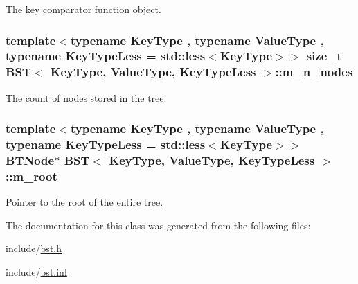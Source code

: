 The key comparator function object. 

\subsubsection[{\texorpdfstring{m\+\_\+n\+\_\+nodes}{m_n_nodes}}]{\setlength{\rightskip}{0pt plus 5cm}template$<$typename Key\+Type , typename Value\+Type , typename Key\+Type\+Less  = std\+::less$<$\+Key\+Type$>$$>$ size\+\_\+t {\bf B\+ST}$<$ Key\+Type, Value\+Type, Key\+Type\+Less $>$\+::m\+\_\+n\+\_\+nodes\hspace{0.3cm}{\ttfamily [private]}}\hypertarget{class_b_s_t_a38f358a38c855ebc8bd866f6ae96aa5a}{}\label{class_b_s_t_a38f358a38c855ebc8bd866f6ae96aa5a}


The count of nodes stored in the tree. 

\subsubsection[{\texorpdfstring{m\+\_\+root}{m_root}}]{\setlength{\rightskip}{0pt plus 5cm}template$<$typename Key\+Type , typename Value\+Type , typename Key\+Type\+Less  = std\+::less$<$\+Key\+Type$>$$>$ {\bf B\+T\+Node}$\ast$ {\bf B\+ST}$<$ Key\+Type, Value\+Type, Key\+Type\+Less $>$\+::m\+\_\+root\hspace{0.3cm}{\ttfamily [private]}}\hypertarget{class_b_s_t_af2a361060692deacc5be429288eece96}{}\label{class_b_s_t_af2a361060692deacc5be429288eece96}


Pointer to the root of the entire tree. 



The documentation for this class was generated from the following files\+:\begin{DoxyCompactItemize}
\item 
include/\hyperlink{bst_8h}{bst.\+h}\item 
include/\hyperlink{bst_8inl}{bst.\+inl}\end{DoxyCompactItemize}
